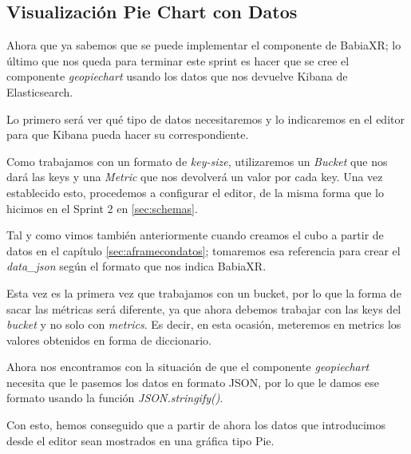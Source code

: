 \documentclass[a4paper, 12pt]{book}
\begin{document}
\subsection{Visualización Pie Chart con Datos}
\label{sec:piewithdata}

Ahora que ya sabemos que se puede implementar el componente de BabiaXR; lo último que nos queda para terminar este sprint es hacer que se cree el componente \textit{geopiechart} usando los datos que nos devuelve Kibana de Elasticsearch.

Lo primero será ver qué tipo de datos necesitaremos y lo indicaremos en el editor para que Kibana pueda hacer su correspondiente.

Como trabajamos con un formato de \textit{key-size}, utilizaremos un \textit{Bucket} que nos dará las keys y una \textit{Metric} que nos devolverá un valor por cada key. Una vez establecido esto, procedemos a configurar el editor, de la misma forma que lo hicimos en el Sprint 2 en \ref{sec:schemas}.



Tal y como vimos también anteriormente cuando creamos el cubo a partir de datos en el capítulo  \ref{sec:aframecondatos}; tomaremos esa referencia para crear el \textit{data\_json} según el formato que nos indica BabiaXR. 

Esta vez es la primera vez que trabajamos con un bucket, por lo que la forma de sacar las métricas será diferente, ya que ahora debemos trabajar con las keys del \textit{bucket} y no solo con \textit{metrics}. Es decir, en esta ocasión, meteremos en metrics los valores obtenidos en forma de diccionario.



Ahora nos encontramos con la situación de que el componente \textit{geopiechart} necesita que le pasemos los datos en formato JSON, por lo que le damos ese formato usando la función \textit{JSON.stringify()}.



Con esto, hemos conseguido que a partir de ahora los datos que introducimos desde el editor sean mostrados en una gráfica tipo Pie.
\end{document}
